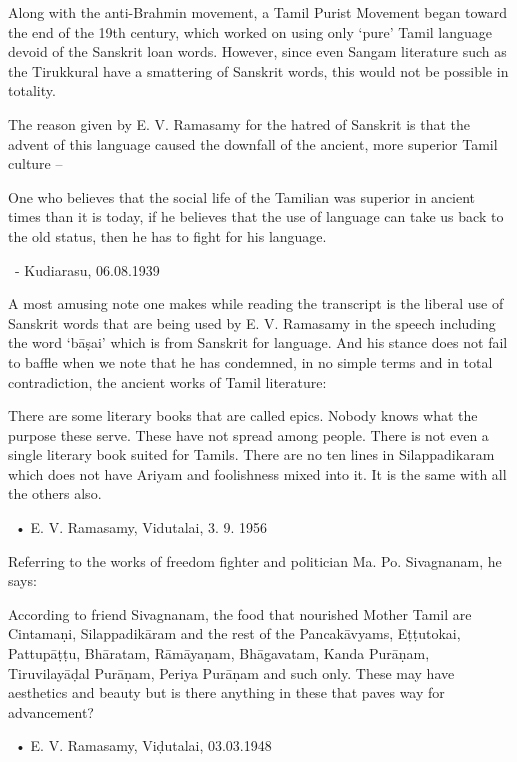 Along with the anti-Brahmin movement, a Tamil Purist Movement began toward the end of the 19th century, which worked on using only ‘pure’ Tamil language devoid of the Sanskrit loan words. However, since even Sangam literature such as the Tirukkural have a smattering of Sanskrit words, this would not be possible in totality.

The reason given by E. V. Ramasamy for the hatred of Sanskrit is that the advent of this language caused the downfall of the ancient, more superior Tamil culture –

\begin{myquote}
One who believes that the social life of the Tamilian was superior in ancient times than it is today, if he believes that the use of language can take us back to the old status, then he has to fight for his language.

~\hfill - Kudiarasu, 06.08.1939
\end{myquote}

A most amusing note one makes while reading the transcript is the liberal use of Sanskrit words that are being used by E. V. Ramasamy in the speech including the word ‘bāṣai’ which is from Sanskrit for language. And his stance does not fail to baffle when we note that he has condemned, in no simple terms and in total contradiction, the ancient works of Tamil literature:

\begin{myquote}
There are some literary books that are called epics. Nobody knows what the purpose these serve. These have not spread among people. There is not even a single literary book suited for Tamils. There are no ten lines in Silappadikaram which does not have Ariyam and foolishness mixed into it. It is the same with all the others also.

~\hfill • E. V. Ramasamy, Vidutalai, 3. 9. 1956
\end{myquote}

Referring to the works of freedom fighter and politician Ma. Po. Sivagnanam, he says:

\begin{myquote}
According to friend Sivagnanam, the food that nourished Mother Tamil are Cintamaṇi, Silappadikāram and the rest of the Pancakāvyams, Eṭṭutokai, Pattupāṭṭu, Bhāratam, Rāmāyaṇam, Bhāgavatam, Kanda Purāṇam, Tiruvilayāḍal Purāṇam, Periya Purāṇam and such only. These may have aesthetics and beauty but is there anything in these that paves way for advancement?

~\hfill • E. V. Ramasamy, Viḍutalai, 03.03.1948
\end{myquote}

